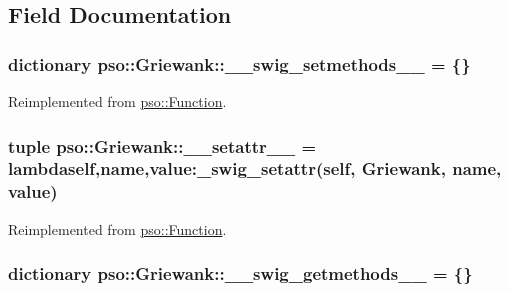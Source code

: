 \subsection{Field Documentation}
\hypertarget{classpso_1_1Griewank_9d6ac056840192478ec5f46980eb1231}{
\subsubsection{\setlength{\rightskip}{0pt plus 5cm}dictionary {\bf pso::Griewank::\_\-\_\-swig\_\-setmethods\_\-\_\-} = \{\}}}
\label{classpso_1_1Griewank_9d6ac056840192478ec5f46980eb1231}




Reimplemented from \hyperlink{classpso_1_1Function_2334bfe507115d58047f67960dde71d3}{pso::Function}.\hypertarget{classpso_1_1Griewank_bf26d6b7263a0aa9ebc00059a5cda5cc}{
\subsubsection{\setlength{\rightskip}{0pt plus 5cm}tuple {\bf pso::Griewank::\_\-\_\-setattr\_\-\_\-} = lambdaself,name,value:\_\-swig\_\-setattr(self, {\bf Griewank}, name, value)}}
\label{classpso_1_1Griewank_bf26d6b7263a0aa9ebc00059a5cda5cc}




Reimplemented from \hyperlink{classpso_1_1Function_cd8775cf6aadc3fdf4e6d82158ef10fb}{pso::Function}.\hypertarget{classpso_1_1Griewank_df761ea1e5152ee4b7aec7de9f3b86c3}{
\subsubsection{\setlength{\rightskip}{0pt plus 5cm}dictionary {\bf pso::Griewank::\_\-\_\-swig\_\-getmethods\_\-\_\-} = \{\}}}
\label{classpso_1_1Griewank_df761ea1e5152ee4b7aec7de9f3b86c3}




